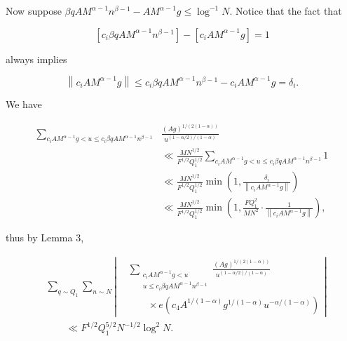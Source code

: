 \documentclass[10pt]{article}
\begin{document}
Now suppose $\beta q A M^{\alpha-1} n^{\beta-1}-A M^{\alpha-1} g \leq \log ^{-1} N$. Notice that the fact that

$$
\left[c_{i} \beta q A M^{\alpha-1} n^{\beta-1}\right]-\left[c_{i} A M^{\alpha-1} g\right]=1
$$

always implies

$$
\left\|c_{i} A M^{\alpha-1} g\right\| \leq c_{i} \beta q A M^{\alpha-1} n^{\beta-1}-c_{i} A M^{\alpha-1} g=\delta_{i}.
$$

We have


\begin{align*}
\sum_{c_{i} A M^{\alpha-1} g<u \leq c_{i} \beta q A M^{\alpha-1} n^{\beta-1}} & \frac{(A g)^{1 /(2(1-\alpha))}}{u^{(1-\alpha / 2) /(1-\alpha)}}  \tag{2.19}\\
& \ll \frac{M N^{1 / 2}}{F^{1 / 2} Q_{1}^{1 / 2}} \sum_{c_{i} A M^{\alpha-1} g<u \leq c_{i} \beta q A M^{\alpha-1} n^{\beta-1}} 1 \\
& \ll \frac{M N^{1 / 2}}{F^{1 / 2} Q_{1}^{1 / 2}} \min \left(1, \frac{\delta_{i}}{\left\|c_{i} A M^{\alpha-1} g\right\|}\right) \\
& \ll \frac{M N^{1 / 2}}{F^{1 / 2} Q_{1}^{1 / 2}} \min \left(1, \frac{F Q_{1}^{2}}{M N^{2}} \cdot \frac{1}{\left\|c_{i} A M^{\alpha-1} g\right\|}\right),
\end{align*}


thus by Lemma 3,

\begin{equation*}
\begin{aligned}
&\sum_{q\sim Q_{1}}\sum_{n\sim N}
\left|
\begin{aligned}
&\sum_{\substack{c_{i}AM^{\alpha-1}g<u\\
                  u\leq c_{i}\beta qAM^{\alpha-1}n^{\beta-1}}}
\frac{(Ag)^{1/(2(1-\alpha))}}{u^{(1-\alpha/2)/(1-\alpha)}} \\
&\qquad\times e\left(c_{4}A^{1/(1-\alpha)}g^{1/(1-\alpha)}
                 u^{-\alpha/(1-\alpha)}\right)
\end{aligned}
\right| \\
&\qquad\ll F^{1/2}Q_{1}^{5/2}N^{-1/2}\log^{2}N.
\end{aligned}
\tag{2.20}
\end{equation*}
\end{document}
